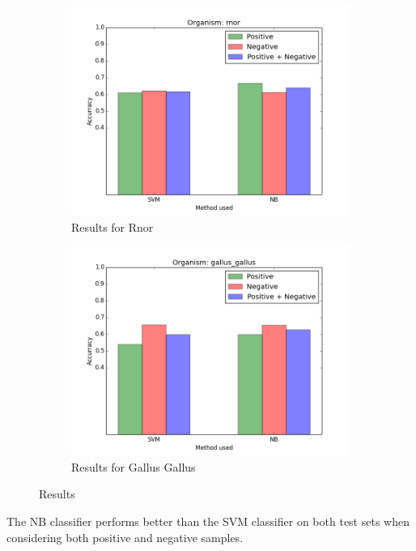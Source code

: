 \documentclass[10pt]{article}
\begin{document}
\begin{figure}[p]
\begin{subfigure}{\textwidth}
\includegraphics[width=1.0\linewidth]{rnor}
\caption{Results for Rnor}
\label{fig:rnor}
\end{subfigure}
\begin{subfigure}{\textwidth}
\includegraphics[width=1.0\linewidth]{gallus_gallus}
\caption{Results for Gallus Gallus}
\label{fig:gallus}
\end{subfigure}
\caption{Results}
\label{fig:results}
\end{figure}

The NB classifier performs better than the SVM classifier on both test sets when considering both positive and negative samples.
\end{document}
